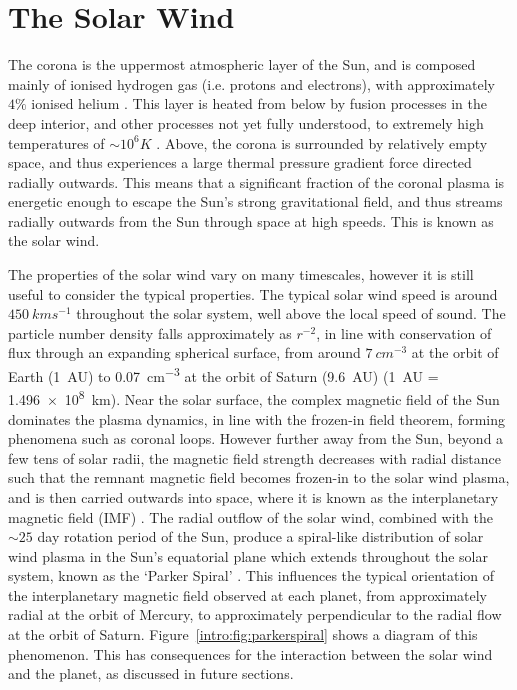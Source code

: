 {\section{The Solar Wind} \label{intro:sec:solarwind}
The corona is the uppermost atmospheric layer of the Sun, and is composed mainly of ionised hydrogen gas (i.e. protons and electrons), with approximately $4\%$ ionised helium \citep{robbins1970}. This layer is heated from below by fusion processes in the deep interior, and other processes not yet fully understood, to extremely high temperatures of ${\sim}10^6\si{K}$ \citep{warren2009}. Above, the corona is surrounded by relatively empty space, and thus experiences a large thermal pressure gradient force directed radially outwards. This means that a significant fraction of the coronal plasma is energetic enough to escape the Sun's strong gravitational field, and thus streams radially outwards from the Sun through space at high speeds. This is known as the solar wind.

The properties of the solar wind vary on many timescales, however it is still useful to consider the typical properties. The typical solar wind speed is around $\SI{450}{kms^{-1}}$ throughout the solar system, well above the local speed of sound. The particle number density falls approximately as $r^{-2}$, in line with conservation of flux through an expanding spherical surface, from around $\SI{7}{cm^{-3}}$ at the orbit of Earth (\SI{1}{AU}) to \SI{0.07}{cm^{-3}} at the orbit of Saturn (\SI{9.6}{AU}) \citep{bagenal2014} (\SI{1}{AU} = \SI{1.496e8}{km}). Near the solar surface, the complex magnetic field of the Sun dominates the plasma dynamics, in line with the frozen-in field theorem, forming phenomena such as coronal loops. However further away from the Sun, beyond a few tens of solar radii, the magnetic field strength decreases with radial distance such that the remnant magnetic field becomes frozen-in to the solar wind plasma, and is then carried outwards into space, where it is known as the interplanetary magnetic field (IMF) \citep{russell2016}. The radial outflow of the solar wind, combined with the ${\sim}25$ day rotation period of the Sun, produce a spiral-like distribution of solar wind plasma in the Sun's equatorial plane which extends throughout the solar system, known as the `Parker Spiral' \citep{parker1958}. This influences the typical orientation of the interplanetary magnetic field observed at each planet, from approximately radial at the orbit of Mercury, to approximately perpendicular to the radial flow at the orbit of Saturn. Figure~\ref{intro:fig:parkerspiral} shows a diagram of this phenomenon. This has consequences for the interaction between the solar wind and the planet, as discussed in future sections.

}

